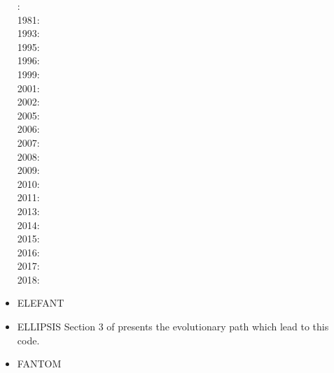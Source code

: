 \begin{itemize}
: \cite{mera80}\\
1981: \cite{mera81}\\
1993: \cite{gowo93}\\
1995: \cite{gowo95}\\
1996: \cite{guez96}\cite{gisb96}\\
1999: \cite{gowo99}\cite{fugo99}\\
2001: \cite{bugw01}\cite{gome01}\\
2002: \cite{bugw02}\\
2005: \cite{gowo05}\cite{vanw05}\cite{vabl05}\cite{gowo05}\\
2006: \cite{degw06}\cite{libi06}\cite{scdm06}\\
2007: \cite{vabl07}\\
2008: \cite{degw08}\cite{degw08b}\\
2009: \cite{ladg09}\cite{plmg09}\\
2010: \cite{vago10}\cite{plmf10}\\
2011: \cite{bagw11}\cite{bagw11b}\\
2013: \cite{plab13}\cite{wagw13}\\
2014: \cite{vagw14}\\
2015: \cite{mags15}\cite{nigo15}\\
2016: \cite{gemg16}\cite{masg16}\\
2017: \cite{ozgw17}\\
2018: \cite{gofv18}\cite{nigw18}\cite{hefg18}

\item ELEFANT 

\cite{tosn15}
\cite{matv15}
\cite{busa16}
\cite{latb17}
\cite{thie17}
\cite{pltv18}
\cite{wohu19}
\cite{frtv19}

\item ELLIPSIS 
Section 3 of \cite{qums07} presents the evolutionary path which lead to this code.

\noindent
\cite{modm03}\cite{wibm03}\cite{mumc03}
\cite{wiwg05}
\cite{onmm06} 
\cite{moql07}\cite{gewm07}\cite{dyrm07}
\cite{onlg08}
\cite{pyeg10}
\cite{legu11}
\cite{lega12}
\cite{recf14}


\item FANTOM 


\end{itemize}

